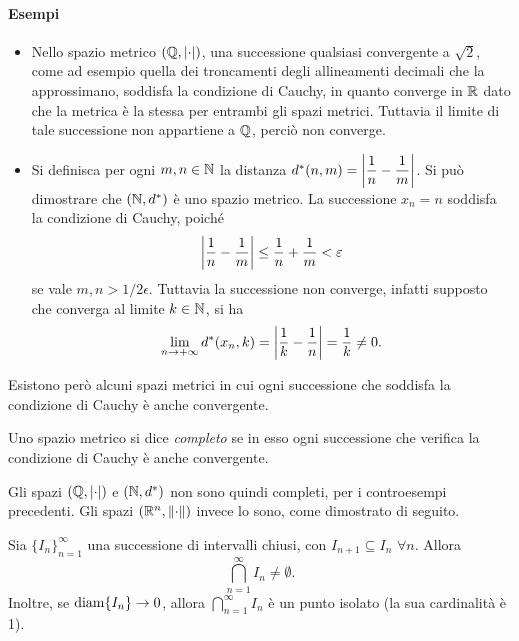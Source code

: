 \paragraph{Esempi}
\begin{itemize}
\item Nello spazio metrico $(\mathbb{Q},\left|{\cdot}\right|)$, una successione qualsiasi convergente a $\sqrt{2}$, come ad esempio quella dei troncamenti degli allineamenti decimali che la approssimano, soddisfa la condizione di Cauchy, in quanto converge in $\mathbb{R}$ dato che la metrica è la stessa per entrambi gli spazi metrici. Tuttavia il limite di tale successione non appartiene a $\mathbb{Q}$, perciò non converge.
\item Si definisca per ogni $m,n\in\mathbb{N}$ la distanza $d^*(n,m)=\left|{\dfrac1{n}-\dfrac1{m}}\right|$. Si può dimostrare che $(\mathbb{N},d^*)$ è uno spazio metrico. La successione $x_n=n$ soddisfa la condizione di Cauchy, poiché
\[
\left|{\frac1{n}-\frac1{m}}\right|\leq\frac1{n}+\frac1{m}<\varepsilon
\]
se vale $m,n>1/2\epsilon$. Tuttavia la successione non converge, infatti supposto che converga al limite $k\in\mathbb{N}$, si ha
\[
\lim_{n\to +\infty} d^*(x_n,k)=\left|{\frac1{k}-\frac1{n}}\right|=\frac1{k}\neq 0.
\]
\end{itemize}
Esistono però alcuni spazi metrici in cui ogni successione che soddisfa la condizione di Cauchy è anche convergente.
\begin{definizione}
Uno spazio metrico si dice \emph{completo} se in esso ogni successione che verifica la condizione di Cauchy è anche convergente.
\end{definizione}
Gli spazi $(\mathbb{Q},\left|{\cdot}\right|)$ e $(\mathbb{N},d^*)$ non sono quindi completi, per i controesempi precedenti. Gli spazi $(\mathbb{R}^n,\left\|{\cdot}\right\|)$ invece lo sono, come dimostrato di seguito.
\begin{lemma}
Sia $\{I_n\}_{n=1}^{\infty}$ una successione di intervalli chiusi, con $I_{n+1}\subseteq I_n$ $\forall n$. Allora
\[
\bigcap_{n=1}^{\infty} I_n\neq\emptyset.
\]
Inoltre, se $\operatorname{diam}\{I_n\}\to 0$, allora $\bigcap_{n=1}^{\infty} I_n$ è un punto isolato (la sua cardinalità è 1).
\end{lemma}
